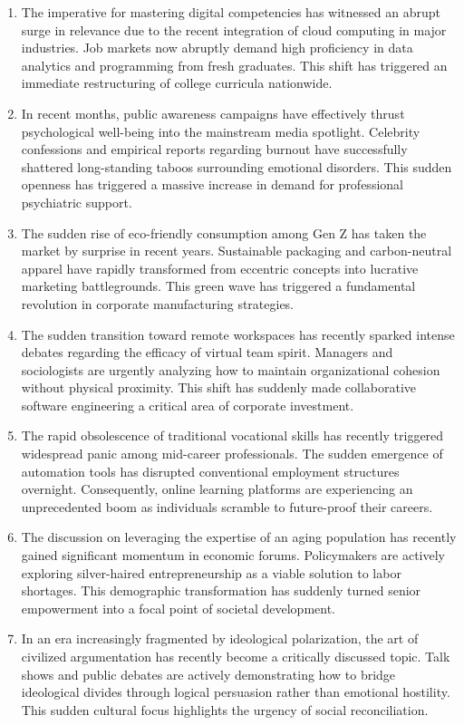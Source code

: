 ﻿\documentclass[lang=cn,11pt]{elegantbook}
\begin{document}
\begin{enumerate}
\item The imperative for mastering digital competencies has witnessed an abrupt surge in relevance due to the recent integration of cloud computing in major industries. Job markets now abruptly demand high proficiency in data analytics and programming from fresh graduates. This shift has triggered an immediate restructuring of college curricula nationwide.
\item In recent months, public awareness campaigns have effectively thrust psychological well-being into the mainstream media spotlight. Celebrity confessions and empirical reports regarding burnout have successfully shattered long-standing taboos surrounding emotional disorders. This sudden openness has triggered a massive increase in demand for professional psychiatric support. 
\item The sudden rise of eco-friendly consumption among Gen Z has taken the market by surprise in recent years. Sustainable packaging and carbon-neutral apparel have rapidly transformed from eccentric concepts into lucrative marketing battlegrounds. This green wave has triggered a fundamental revolution in corporate manufacturing strategies.
\item The sudden transition toward remote workspaces has recently sparked intense debates regarding the efficacy of virtual team spirit. Managers and sociologists are urgently analyzing how to maintain organizational cohesion without physical proximity. This shift has suddenly made collaborative software engineering a critical area of corporate investment. 
\item The rapid obsolescence of traditional vocational skills has recently triggered widespread panic among mid-career professionals. The sudden emergence of automation tools has disrupted conventional employment structures overnight. Consequently, online learning platforms are experiencing an unprecedented boom as individuals scramble to future-proof their careers. 
\item The discussion on leveraging the expertise of an aging population has recently gained significant momentum in economic forums. Policymakers are actively exploring silver-haired entrepreneurship as a viable solution to labor shortages. This demographic transformation has suddenly turned senior empowerment into a focal point of societal development. 
\item In an era increasingly fragmented by ideological polarization, the art of civilized argumentation has recently become a critically discussed topic. Talk shows and public debates are actively demonstrating how to bridge ideological divides through logical persuasion rather than emotional hostility. This sudden cultural focus highlights the urgency of social reconciliation. 

\end{enumerate}
\end{document}
